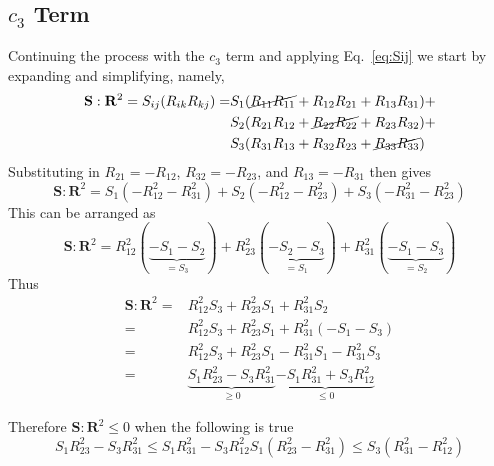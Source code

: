 \newcommand{\term}{\mathbf{S}:\mathbf{R}^2}
\subsection{$c_{3}$ Term}
Continuing the process with the $c_{3}$ term and applying Eq.~\ref{eq:Sij}
we start by expanding and simplifying, namely,
\begin{equation}
    \begin{split}
        \mathbf{S}:\mathbf{R}^2 =  S_{ij}(R_{ik}R_{kj}) = &  
                S_{1}(\cancel{R_{11} R_{11}} + R_{12} R_{21} + R_{13} R_{31}) +     \\
            &   S_{2}(R_{21} R_{12} + \cancel{R_{22} R_{22}} + R_{23} R_{32}) +     \\
            &   S_{3}(R_{31} R_{13} + R_{32} R_{23} + \cancel{R_{33} R_{33}})
    \end{split}
\end{equation}
Substituting in $R_{21} = -R_{12}$, $R_{32} = -R_{23}$, and $R_{13} = -
R_{31}$ then gives
\begin{equation}
        \term = 
        S_{1} (-R_{12}^2 - R_{31}^2)  +
        S_{2} (-R_{12}^2 - R_{23}^2)  +
        S_{3} (-R_{31}^2 - R_{23}^2)
\end{equation}
This can be arranged as
\begin{equation}
        \term = 
        R_{12}^{2} (\underbrace{-S_{1} - S_{2}}_{= S_{3}}) + 
        R_{23}^{2} (\underbrace{-S_{2} - S_{3}}_{= S_{1}}) + 
        R_{31}^{2} (\underbrace{-S_{1} - S_{3}}_{= S_{2}})  
\end{equation}
Thus
\begin{subequations}
    \begin{align}
        \term = & 
            R_{12}^2 S_{3} + R_{23}^2 S_{1} + R_{31}^2 S_{2}                  \\
         = & R_{12}^2 S_{3} + R_{23}^2 S_{1} + R_{31}^2 (-S_{1} - S_{3})       \\
         = & R_{12}^2 S_{3} + R_{23}^2 S_{1} - R_{31}^2 S_{1} - R_{31}^2 S_{3} \\ 
         = & \underbrace{S_{1} R_{23}^2 - S_{3} R_{31}^{2}}_{\geq 0}          
                \underbrace{-S_{1} R_{31}^2 + S_{3} R_{12}^2}_{\leq 0}
    \end{align}
\end{subequations}

Therefore $\mathbf{S}:\mathbf{R}^2 \leq 0$ when the following is true
\begin{subequations}
    \begin{equation}
        S_{1} R_{23}^2 - S_{3} R_{31}^2 \leq S_{1} R_{31}^2 - S_{3} R_{12}^2
    \end{equation}
    \begin{equation}
        S_{1} (R_{23}^2 - R_{31}^{2}) \leq S_{3} ( R_{31}^2 - R_{12}^2)
    \end{equation}
    \label{eq:c3-inequal}
\end{subequations}     \\

